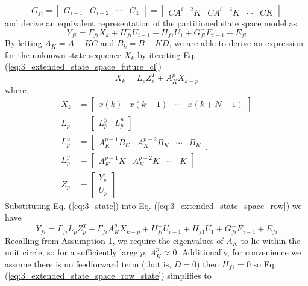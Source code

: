 \begin{equation*}
G_{fi}^{-} = \begin{bmatrix} G_{i-1} & G_{i-2} & \cdots & G_1\end{bmatrix} = \begin{bmatrix} CA^{i-2}K & CA^{i-3}K & \cdots & CK\end{bmatrix}
\end{equation*}
and derive an equivalent representation of the partitioned state space model as
\begin{equation}\label{eq:3_extended_state_space_row}
Y_{fi} = \Gamma_{fi}X_k + H_{fi}^- U_{i-1} + H_{f1}U_1 + G_{fi}^- E_{i-1} + E_{fi}
\end{equation}
By letting $A_K = A - KC$ and $B_k = B-KD$, we are able to derive an expression for the unknown state sequence $X_k$ by iterating Eq. (\ref{eq:3_extended_state_space_future_cl})
\begin{equation}\label{eq:3_state}
X_k = L_p Z_p^T + A_K^p X_{k-p}
\end{equation}
where
\begin{align*}
X_k &= \begin{bmatrix} x(k) & x(k+1) & \cdots & x(k+N-1)\end{bmatrix}\\
L_p &= \begin{bmatrix}L_p^y & L_p^u\end{bmatrix}\\
L_p^u &= \begin{bmatrix}A_K^{p-1}B_K & A_K^{p-2}B_K & \cdots & B_K\end{bmatrix}\\
L_p^y &= \begin{bmatrix}A_K^{p-1}K & A_K^{p-2}K & \cdots & K\end{bmatrix}\\
Z_p &= \begin{bmatrix} Y_p \\ U_p\end{bmatrix}
\end{align*}
Substituting Eq. (\ref{eq:3_state}) into Eq. (\ref{eq:3_extended_state_space_row}) we have
\begin{equation}\label{eq:3_extended_state_space_row_state}
Y_{fi} = \Gamma_{fi}L_p Z_p^T + \Gamma_{fi}A_{K}^p X_{k-p} + H_{fi}^- U_{i-1} + H_{f1}U_1 + G_{fi}^- E_{i-1} + E_{fi}
\end{equation}
Recalling from Assumption 1, we require the eigenvalues of $A_K$ to lie within the unit circle, so for a sufficiently large $p$, $A_K^p \approx 0$. Additionally, for convenience we assume there is no feedforward term (that is, $D = 0$) then $H_{f1} = 0$ so Eq. (\ref{eq:3_extended_state_space_row_state}) simplifies to

